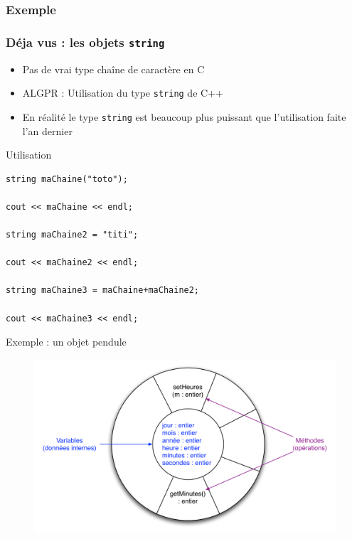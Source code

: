\subsubsection{Exemple}


\begin{frame}[fragile]
\frametitle{Déja vus : les objets \texttt{string}}
\begin{itemize}
\item Pas de vrai type chaîne de caractère en C
\item ALGPR : Utilisation du type \texttt{string} de C++
\item En réalité le type \texttt{string} est beaucoup plus puissant que l'utilisation faite l'an dernier
\end{itemize}
\begin{exampleblock}{Utilisation}
\begin{lstlisting}
string maChaine("toto");

cout << maChaine << endl;

string maChaine2 = "titi";

cout << maChaine2 << endl;

string maChaine3 = maChaine+maChaine2;

cout << maChaine3 << endl;
\end{lstlisting}
\end{exampleblock}
\end{frame}
\begin{frame}{{\href{code/Pendule.cxx}{}} Exemple : un objet pendule}
  \begin{figure}[htbp]
    \begin{center}
      \includegraphics[scale=.45]{fig/encapsulation2.pdf}
    \end{center}
  \end{figure}
\end{frame}

